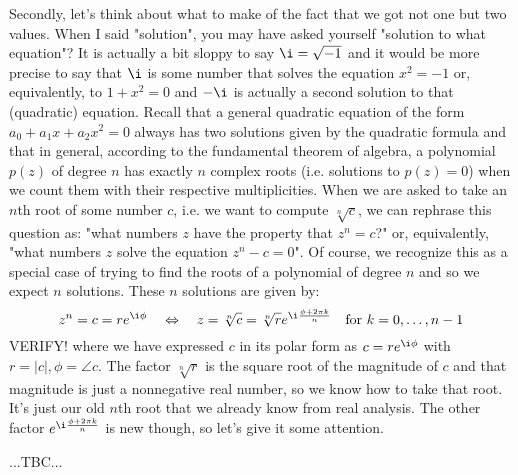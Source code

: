 \medskip
Secondly, let's think about what to make of the fact that we got not one but two values. When I said "solution", you may have asked yourself "solution to what equation"? It is actually a bit sloppy to say $\i = \sqrt{-1}$ and it would be more precise to say that $\i$ is some number that solves the equation $x^2 = -1$ or, equivalently, to  $1 + x^2 = 0$ and $-\i$ is actually a second solution to that (quadratic) equation. Recall that a general quadratic equation of the form $a_0 + a_1 x + a_2 x^2 = 0$  always has two solutions given by the quadratic formula and that in general, according to the fundamental theorem of algebra, a polynomial $p(z)$ of degree $n$ has exactly $n$ complex roots (i.e. solutions to $p(z) = 0$) when we count them with their respective multiplicities. When we are asked to take an $n$th root of some number $c$, i.e. we want to compute $\sqrt[n]{c}$, we can rephrase this question as: "what numbers $z$ have the property that $z^n = c$?" or, equivalently, "what numbers $z$ solve the equation $z^n - c = 0$". Of course, we recognize this as a special case of trying to find the roots of a polynomial of degree $n$ and so we expect $n$ solutions. These $n$ solutions are given by:
\begin{equation}
 z^n = c = r e^{\i \phi} \quad \Leftrightarrow \quad
 z = \sqrt[n]{c} = \sqrt[n]{r} e^{\i \frac{\phi + 2 \pi k}{n}} \quad \text{for } k = 0,\ldots,n-1
\end{equation}
VERIFY! where we have expressed $c$ in its polar form as $c = r e^{\i \phi}$ with $r = |c|, \phi = \angle c$. The factor $\sqrt[n]{r}$ is the square root of the magnitude of $c$ and that magnitude is just a nonnegative real number, so we know how to take that root. It's just our old $n$th root that we already know from real analysis. The other factor $e^{\i \frac{\phi + 2 \pi k}{n}}$ is new though, so let's give it some attention.




...TBC...




